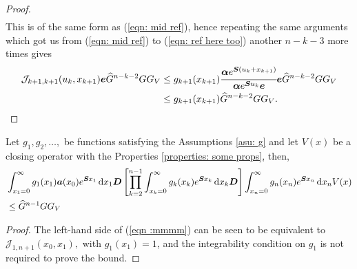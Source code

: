 \begin{proof}
\begin{align}
	\end{align} 
	This is of the same form as (\ref{eqn: mid ref}), hence repeating the same arguments which got us from (\ref{eqn: mid ref}) to (\ref{eqn: ref here too}) another \(n-k-3\) more times gives
	 \begin{align*}
		\mathcal J_{k+1,k+1}(u_k,x_{k+1}) \boldsymbol e  \widehat G^{n-k-2}G G_V
		&\leq g_{k+1}(x_{k+1}) \cfrac{\boldsymbol\alpha e^{\boldsymbol{S}(u_k+x_{k+1})}}{\boldsymbol \alpha e^{\boldsymbol{S}u_k}\boldsymbol e} \boldsymbol e\widehat G^{n-k-2}G G_V
		\\& \leq g_{k+1}(x_{k+1}) \widehat G^{n-k-2}G G_V.
	\end{align*} 
\end{proof}	
\begin{cor}\label{cor: ksjkd}
	Let \(g_1, g_2, \dots,\) be functions satisfying the Assumptions \ref{asu: g} and let \(V(x)\) be a closing operator with the Properties \ref{properties: some props}, then,
	\begin{align}
		&\int_{x_1=0}^\infty g_1(x_1) \boldsymbol a (x_0) e^{\boldsymbol{S}x_1}\, \mathrm{d} x_1\boldsymbol D 
            	\left[\prod_{k=2}^{n-1}\int_{x_k=0}^\infty g_k(x_k) e^{\boldsymbol{S}x_k} \, \mathrm{d} x_k \boldsymbol D\right] \int_{x_n=0}^\infty g_{n}(x_n) e^{\boldsymbol{S}x_n} \, \mathrm{d} x_n V(x) \nonumber 
		\\&\leq \widehat{G}^{n-1}GG_V \label{eqn :mmmm}
	\end{align}
\end{cor}
\begin{proof}
	The left-hand side of (\ref{eqn :mmmm}) can be seen to be equivalent to \(\mathcal J_{1,n+1}(x_0,x_1),\) with \(g_1(x_1)=1\), and the integrability condition on \(g_1\) is not required to prove the bound. 
\end{proof}

